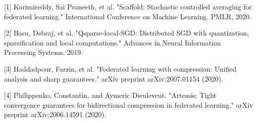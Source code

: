 \documentclass{article}
\begin{document}
[1] Karimireddy, Sai Praneeth, et al. "Scaffold: Stochastic controlled averaging for federated learning." International Conference on Machine Learning. PMLR, 2020.\vspace{-2pt} 

[2] Basu, Debraj, et al. "Qsparse-local-SGD: Distributed SGD with quantization, sparsification and local computations." Advances in Neural Information Processing Systems. 2019.\vspace{-2pt} 

[3] Haddadpour, Farzin, et al. "Federated learning with compression: Unified analysis and sharp guarantees." arXiv preprint arXiv:2007.01154 (2020).\vspace{-2pt} 

[4] Philippenko, Constantin, and Aymeric Dieuleveut. "Artemis: Tight convergence guarantees for bidirectional compression in federated learning." arXiv preprint arXiv:2006.14591 (2020).
\end{document}
